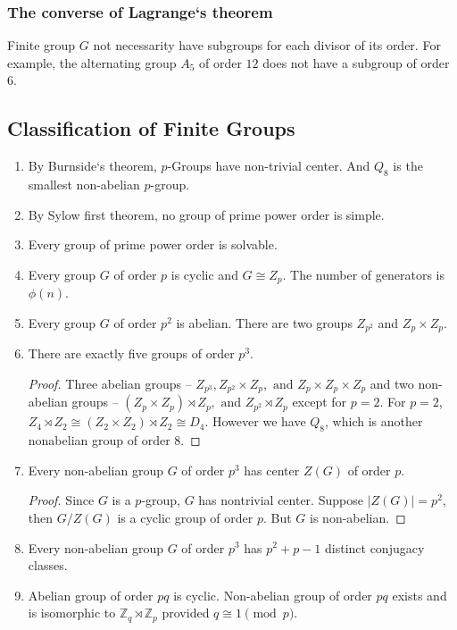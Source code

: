 \subsubsection{The converse of Lagrange`s theorem}
Finite group $G$ not necessarity have subgroups for each divisor of its order.
	For example, the alternating group $A_5$ of order $12$ does not have a subgroup of order $6$.

\subsection{Classification of Finite Groups}
\begin{enumerate}
	\item By Burnside`s theorem, $p$-Groups have non-trivial center. And $Q_8$ is the smallest non-abelian $p$-group.
	\item By Sylow first theorem, no group of prime power order is simple.
	\item Every group of prime power order is solvable.
	\item Every group $G$ of order $p$ is cyclic and $G \cong Z_p$. The number of generators is $\phi(n)$.
	\item Every group $G$ of order $p^2$ is abelian. There are two groups $Z_{p^2}$ and $Z_p \times Z_p$.
	\item There are exactly five groups of order $p^3$.
	\begin{proof}
		Three abelian groups -- $Z_{p^3}, Z_{p^2} \times Z_p, \text{ and } Z_p \times Z_p \times Z_p$ and two non-abelian groups -- $(Z_p \times Z_p) \rtimes Z_p, \text{ and } Z_{p^2} \rtimes Z_p$ except for $p =2$. For $p=2$, $Z_4 \rtimes Z_2 \cong (Z_2 \times Z_2) \rtimes Z_2 \cong D_4$. However we have $Q_8$, which is another nonabelian group of order $8$.
	\end{proof}
	\item Every non-abelian group $G$ of order $p^3$ has center $Z(G)$ of order $p$.
	\begin{proof}
		Since $G$ is a $p$-group, $G$ has nontrivial center. Suppose $|Z(G)| = p^2$, then $G/Z(G)$ is a cyclic group of order $p$. But $G$ is non-abelian.
	\end{proof}
	\item Every non-abelian group $G$ of order $p^3$ has $p^2+p-1$ distinct conjugacy classes.
	\item Abelian group of order $pq$ is cyclic. Non-abelian group of order $pq$ exists and is isomorphic to $\mathbb{Z}_q \rtimes \mathbb{Z}_p$ provided $q \cong 1 \pmod{p}$.

\end{enumerate}
